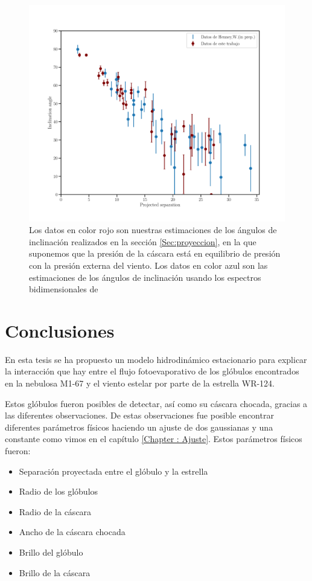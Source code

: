\documentclass{book}
\begin{document}
\begin{figure}[htb]
    \centering
    \includegraphics[width=\textwidth]{Nuevas imagenes finales/W_1.pdf}
    \caption{Los datos en color rojo son nuestras estimaciones de los ángulos de inclinación realizados en la sección \ref{Sec:proyeccion}, en la que suponemos que la presión de la cáscara está en equilibrio de presión con la presión externa del viento. Los datos en color azul son las estimaciones de los ángulos de inclinación usando los espectros bidimensionales de \cite{Zavala:2022}}
    \label{fig:ang_Will}
\end{figure}

\chapter{Conclusiones}

En esta tesis se ha propuesto un modelo hidrodinámico estacionario para explicar la interacción que hay entre el flujo fotoevaporativo de los glóbulos encontrados en la nebulosa M1-67 y el viento estelar por parte de la estrella WR-124. 

Estos glóbulos fueron posibles de detectar, así como su cáscara chocada, gracias a las diferentes observaciones. De estas observaciones fue posible encontrar diferentes parámetros físicos haciendo un ajuste de dos gaussianas y una constante como vimos en el capítulo \ref{Chapter : Ajuste}. Estos parámetros físicos fueron:

\begin{itemize}
    \item Separación proyectada entre el glóbulo y la estrella
    \item Radio de los glóbulos
    \item Radio de la cáscara
    \item Ancho de la cáscara chocada
    \item Brillo del glóbulo
    \item Brillo de la cáscara
\end{itemize}
\end{document}
